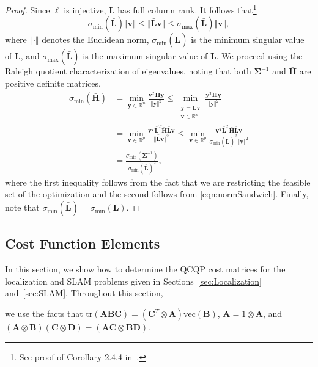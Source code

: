 \documentclass[lettersize,journal]{IEEEtran}
\newcommand{\vect}[1]{\mbox{vec}(#1)}
\newcommand{\tr}[1]{\mbox{tr}\left(#1\right)}
\begin{document}
{\begin{proof}
Since $\bm{\ell}$ is injective, $\bar{\bm{L}}$ has full column rank. It follows that\footnote{See proof of Corollary 2.4.4 in~\cite{golubMatrixComputations2013}.}
\begin{equation}\label{eqn:normSandwich}
	\sigma_{\min}(\bar{\bm{L}}) \Vert\bm{v}\Vert \leq  \Vert\bar{\bm{L}}\bm{v}\Vert \leq \sigma_{\max}(\bar{\bm{L}})\Vert\bm{v}\Vert,
\end{equation}
where $\Vert\cdot\Vert$ denotes the Euclidean norm, $\sigma_{\min}(\bar{\bm{L}})$ is the minimum singular value of $\bm{L}$, and $\sigma_{\max}(\bar{\bm{L}})$ is the maximum singular value of $\bm{L}$. We proceed using the Raleigh quotient characterization of eigenvalues, noting that both $\bm{\Sigma}^{-1}$ and $\bar{\bm{H}}$ are positive definite matrices.
\begin{align*}
	\sigma_{\min}(\bar{\bm{H}}) &= \min\limits_{\bm{y}\in\mathbb{R}^n} \frac{\bm{y}^T \bar{\bm{H}} \bm{y}}{\Vert\bm{y}\Vert^2} 
	\leq \min\limits_{\substack{\bm{y}=\bar{\bm{L}}\bm{v}\\\bm{v}\in\mathbb{R}^p}} \frac{\bm{y}^T \bar{\bm{H}} \bm{y}}{\Vert\bm{y}\Vert^2} \\&= \min\limits_{\bm{v}\in\mathbb{R}^p} \frac{\bm{v}^T \bar{\bm{L}}^T\bar{\bm{H}}\bar{\bm{L}} \bm{v}}{\Vert\bar{\bm{L}}\bm{v}\Vert^2 }  
	\leq \min\limits_{\bm{v}\in\mathbb{R}^p} \frac{\bm{v}^T \bar{\bm{L}}^T\bar{\bm{H}}\bar{\bm{L}} \bm{v}}{\sigma_{\min}(\bar{\bm{L}})^2\Vert\bm{v}\Vert^2 } 
	\\&= \frac{\sigma_{\min}(\bm{\Sigma}^{-1})}{\sigma_{\min}(\bar{\bm{L}})^2},
\end{align*}
where the first inequality follows from the fact that we are restricting the feasible set of the optimization and the second follows from \eqref{eqn:normSandwich}. Finally, note that $\sigma_{\min}(\bar{\bm{L}}) = \sigma_{\min}(\bm{L})$.

\end{proof}

\subsection{Cost Function Elements}\label{App:LocCost}

In this section, we show how to determine the QCQP cost matrices for the localization and SLAM problems given in Sections~\ref{sec:Localization} and~\ref{sec:SLAM}. Throughout this section, } we use the facts that $ \tr{\bm{A}\bm{B}\bm{C}} = (\bm{C}^T\otimes\bm{A}) \vect{\bm{B}}$, $ \bm{A} = 1\otimes\bm{A} $, and $ (\bm{A}\otimes\bm{B})(\bm{C}\otimes\bm{D}) = (\bm{AC}\otimes\bm{BD}) $\cite{magnusMatrixDifferentialCalculus2019}. 
\end{document}
